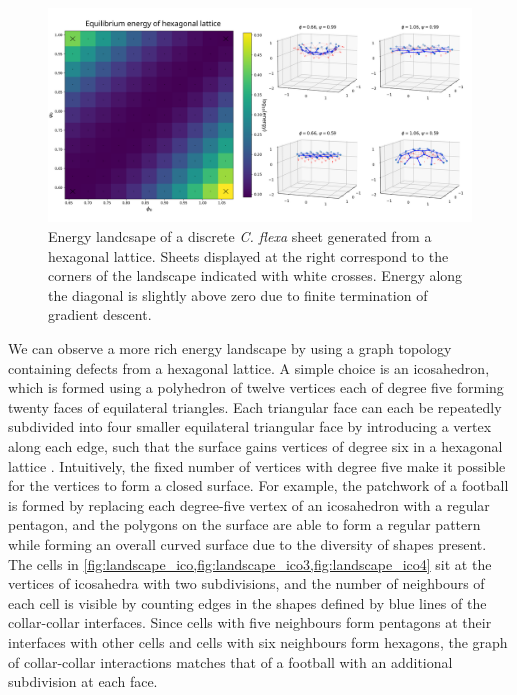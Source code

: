 \begin{figure}
	\centering
	\includegraphics[width=\textwidth]{landscape_hex.png}
	\caption[Energy landscape of a discrete \textit{C. flexa} sheet generated from a hexagonal lattice]{Energy landcsape of a discrete \textit{C. flexa} sheet generated from a hexagonal lattice. Sheets displayed at the right correspond to the corners of the landscape indicated with white crosses. Energy along the diagonal is slightly above zero due to finite termination of gradient descent.}
	\label{fig:landscape_flat}
\end{figure}

We can observe a more rich energy landscape by using a graph topology containing defects from a hexagonal lattice.
A simple choice is an icosahedron, which is formed using a polyhedron of twelve vertices each of degree five forming twenty faces of equilateral triangles.
Each triangular face can each be repeatedly subdivided into four smaller equilateral triangular face by introducing a vertex along each edge, such that the surface gains vertices of degree six in a hexagonal lattice \citep{cromwell1997}.
Intuitively, the fixed number of vertices with degree five make it possible for the vertices to form a closed surface.
For example, the patchwork of a football is formed by replacing each degree-five vertex of an icosahedron with a regular pentagon, and the polygons on the surface are able to form a regular pattern while forming an overall curved surface due to the diversity of shapes present.
The cells in \cref{fig:landscape_ico,fig:landscape_ico3,fig:landscape_ico4} sit at the vertices of icosahedra with two subdivisions, and the number of neighbours of each cell is visible by counting edges in the shapes defined by blue lines of the collar-collar interfaces.
Since cells with five neighbours form pentagons at their interfaces with other cells and cells with six neighbours form hexagons, the graph of collar-collar interactions matches that of a football with an additional subdivision at each face.

